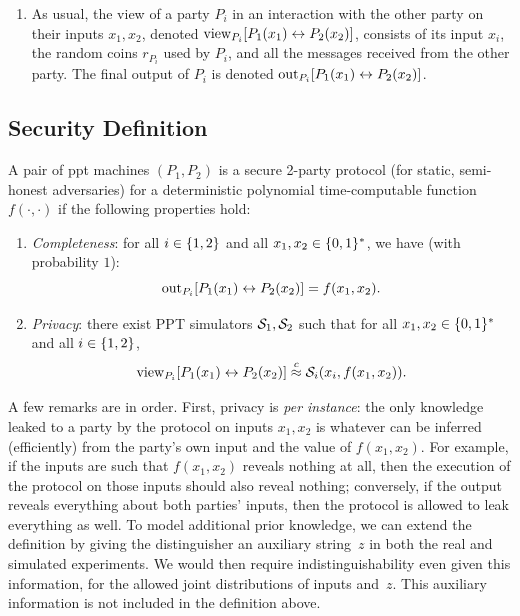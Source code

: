 \documentclass[11pt]{article}
\begin{document}
\begin{enumerate}
\item As usual, the view of a party $P_i$ in an interaction with the
  other party on their inputs $x_{1}, x_{2}$, denoted
  $\text{view}_{P_{i}}[P_{1}(x_{1}) \leftrightarrow P_{2}(x_{2})]$, consists
  of its input $x_i$, the random coins $r_{P_i}$ used by $P_{i}$, and
  all the messages received from the other party.  The final output of
  $P_{i}$ is denoted $\text{out}_{P_{i}}[P_{1}(x_{1}) \leftrightarrow
  P_{2}(x_{2})]$.
\end{enumerate}

\subsection{Security Definition}
\label{sec:security-definition}

\begin{definition}
  \label{def:two-party}
  A pair of ppt machines $(P_1,P_2)$ is a secure 2-party protocol (for
  static, semi-honest adversaries) for a deterministic polynomial
  time-computable function $f(\cdot,\cdot)$ if the following
  properties hold:
  \begin{enumerate}
  \item \emph{Completeness}: for all $i \in \{1,2\}$ and all $x_1,
    x_2 \in \{0,1\}^{*}$, we have (with probability $1$): \[
    \text{out}_{P_{i}}[P_{1}(x_{1}) \leftrightarrow P_{2}(x_{2})] =
    f(x_1,x_2). \]

  \item \emph{Privacy}: there exist PPT simulators $\mathcal{S}_1, \mathcal{S}_2$
    such that for all $x_{1}, x_{2} \in \{0,1\}^{*}$ and all $i \in
    \{1,2\}$, \[ \text{view}_{P_{i}}[P_{1}(x_{1}) \leftrightarrow
    P_{2}(x_{2})] \stackrel{c}{\approx} \mathcal{S}_{i}(x_{i}, f(x_{1}, x_{2})). \]
  \end{enumerate}
\end{definition}

A few remarks are in order.
First, privacy is \emph{per instance}: the only knowledge leaked to a party by the protocol on inputs $x_{1}, x_{2}$ is whatever can be inferred (efficiently) from the party's own input and the value of $f(x_{1}, x_{2})$.
For example, if the inputs are such that $f(x_{1}, x_{2})$ reveals nothing at all, then the execution of the protocol on those inputs should also reveal nothing; conversely, if the output reveals everything about both parties' inputs, then the protocol is allowed to leak everything as well.
To model additional prior knowledge, we can extend the definition by giving the distinguisher an auxiliary string~$z$ in both the real and simulated experiments.
We would then require indistinguishability even given this information, for the allowed joint distributions of inputs and~$z$.
This auxiliary information is not included in the definition above.
\end{document}
